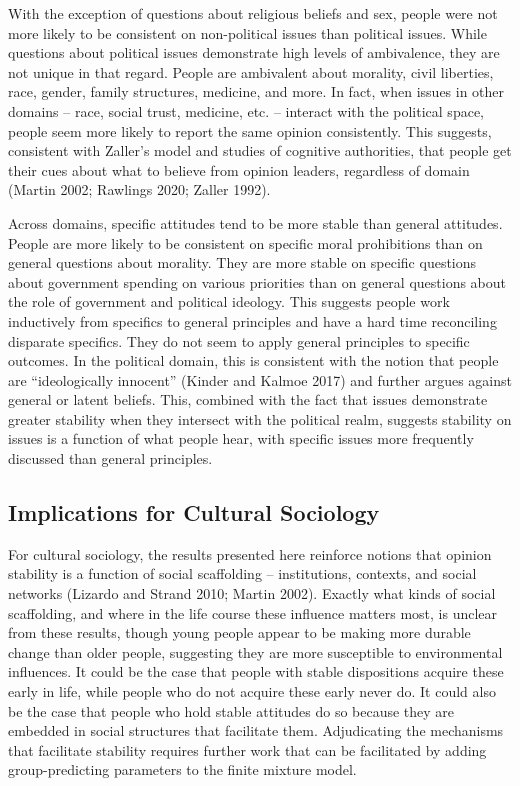 \documentclass[12pt,]{article}
\begin{document}
With the exception of questions about religious beliefs and sex, people were not more likely to be consistent on non-political issues than political issues. While questions about political issues demonstrate high levels of ambivalence, they are not unique in that regard. People are ambivalent about morality, civil liberties, race, gender, family structures, medicine, and more. In fact, when issues in other domains -- race, social trust, medicine, etc. -- interact with the political space, people seem more likely to report the same opinion consistently. This suggests, consistent with Zaller's model and studies of cognitive authorities, that people get their cues about what to believe from opinion leaders, regardless of domain (Martin 2002; Rawlings 2020; Zaller 1992).

Across domains, specific attitudes tend to be more stable than general attitudes. People are more likely to be consistent on specific moral prohibitions than on general questions about morality. They are more stable on specific questions about government spending on various priorities than on general questions about the role of government and political ideology. This suggests people work inductively from specifics to general principles and have a hard time reconciling disparate specifics. They do not seem to apply general principles to specific outcomes. In the political domain, this is consistent with the notion that people are ``ideologically innocent'' (Kinder and Kalmoe 2017) and further argues against general or latent beliefs. This, combined with the fact that issues demonstrate greater stability when they intersect with the political realm, suggests stability on issues is a function of what people hear, with specific issues more frequently discussed than general principles.

\hypertarget{implications-for-cultural-sociology}{%
\subsection{Implications for Cultural Sociology}\label{implications-for-cultural-sociology}}

For cultural sociology, the results presented here reinforce notions that opinion stability is a function of social scaffolding -- institutions, contexts, and social networks (Lizardo and Strand 2010; Martin 2002). Exactly what kinds of social scaffolding, and where in the life course these influence matters most, is unclear from these results, though young people appear to be making more durable change than older people, suggesting they are more susceptible to environmental influences. It could be the case that people with stable dispositions acquire these early in life, while people who do not acquire these early never do. It could also be the case that people who hold stable attitudes do so because they are embedded in social structures that facilitate them. Adjudicating the mechanisms that facilitate stability requires further work that can be facilitated by adding group-predicting parameters to the finite mixture model.
\end{document}
